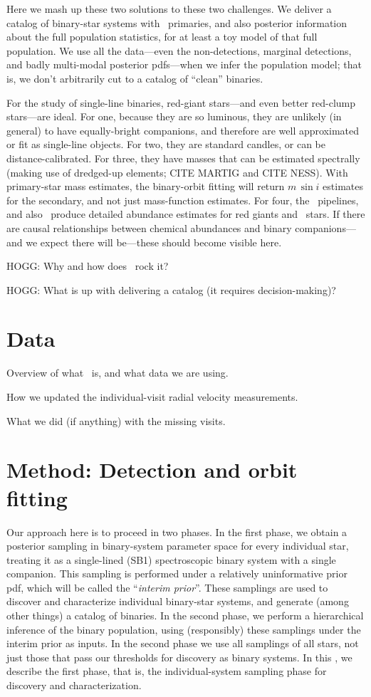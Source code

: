 \documentclass[modern, letterpaper]{aastex61}
\newcommand{\apogee}{\project{\acronym{APOGEE}}}
\newcommand{\thecannon}{\project{The~Cannon}}
\newcommand{\RC}{\acronym{RC}}
\begin{document}
Here we mash up these two solutions to these two challenges.
We deliver a catalog of binary-star systems with \RC\ primaries, and also
posterior information about the full population statistics, for at least
a toy model of that full population.
We use all the data---even the non-detections, marginal detections, and
badly multi-modal posterior pdfs---when we infer the population model;
that is, we don't arbitrarily cut to a catalog of ``clean'' binaries.

For the study of single-line binaries, red-giant stars---and even
better red-clump stars---are ideal.
For one, because they are so luminous, they are unlikely (in general)
to have equally-bright companions, and therefore are well approximated
or fit as single-line objects.
For two, they are standard candles, or can be distance-calibrated.
For three, they have masses that can be estimated spectrally (making
use of dredged-up elements; CITE MARTIG and CITE NESS).
With primary-star mass estimates, the binary-orbit fitting will return
$m\,\sin i$ estimates for the secondary, and not just mass-function
estimates.
For four, the \apogee\ pipelines, and also \thecannon\, produce
detailed abundance estimates for red giants and \RC\ stars.
If there are causal relationships between chemical abundances and
binary companions---and we expect there will be---these should become
visible here.

HOGG: Why and how does \apogee\ rock it?

HOGG: What is up with delivering a catalog (it requires decision-making)?

\section{Data}

Overview of what \apogee\ is, and what data we are using.

How we updated the individual-visit radial velocity measurements.

What we did (if anything) with the missing visits.

\section{Method: Detection and orbit fitting}\label{sec:fitting}

Our approach here is to proceed in two phases.
In the first phase, we obtain a posterior sampling in binary-system
parameter space for every individual star, treating it as a
single-lined (SB1) spectroscopic binary system with a single
companion.
This sampling is performed under a relatively uninformative prior pdf,
which will be called the ``\emph{interim prior}''.
These samplings are used to discover and characterize individual binary-star
systems, and generate (among other things) a catalog of binaries.
In the second phase, we perform a hierarchical inference of the binary
population, using (responsibly) these samplings under the interim
prior as inputs.
In the second phase we use all samplings of all stars, not just those that
pass our thresholds for discovery as binary systems.
In this \sectionname, we describe the first phase, that is, the
individual-system sampling phase for discovery and characterization.
\end{document}
